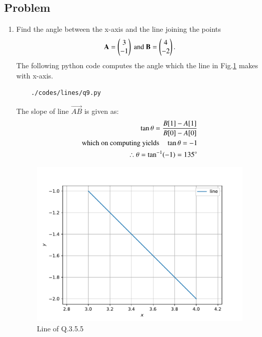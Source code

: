 \subsection{Problem}

\renewcommand{\theequation}{\theenumi}
\begin{enumerate}[label=\thesection.\arabic*.,ref=\thesection.\theenumi]
	\item Find the angle between the x-axis and the line joining the points 
	\begin{align}
\mathbf{A} = \begin{pmatrix}3\\-1\end{pmatrix}\text{ and }\mathbf{B} = \begin{pmatrix}4\\-2\end{pmatrix}.
	\end{align}
	The following python code computes the angle which the line in Fig.\ref{fig:qnine} makes with x-axis.
	\begin{lstlisting}
	./codes/lines/q9.py
	\end{lstlisting}
	
	\solution The slope of line $\vec{AB}$ is given as:
	\begin{align}
\tan \theta = \frac{B[1]-A[1]}{B[0]-A[0]}
		\\
\text{which on computing yields} \quad \tan \theta = -1
\\
\therefore \theta = \tan^{-1}(-1) = 135\degree	
	\end{align}

	\begin{figure}[!ht]
	\centering
	\includegraphics[width=\columnwidth]{./figs/lines/q9.pdf}
	\caption{Line of Q.3.5.5}
	\label{fig:qnine}	
	\end{figure}
	
\end{enumerate}

